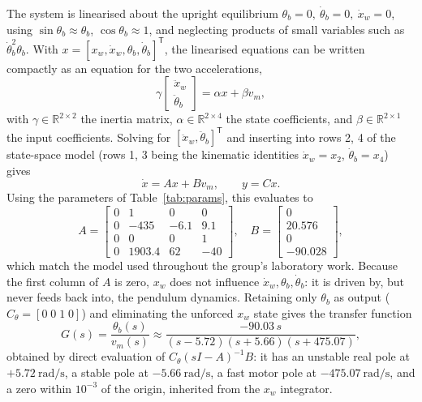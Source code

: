 \documentclass[conference]{IEEEtran}
\newcommand{\mat}[1]{\begin{bmatrix}#1\end{bmatrix}}
\begin{document}
The system is linearised about the upright equilibrium $\theta_b=0,\ \dot\theta_b=0,\ \dot x_w=0$, using $\sin\theta_b\approx\theta_b$, $\cos\theta_b\approx1$, and neglecting products of small variables such as $\dot\theta_b^2\theta_b$. With $x=[x_w,\dot x_w,\theta_b,\dot\theta_b]^{\mathsf T}$, the linearised equations can be written compactly as an equation for the two accelerations,
\begin{equation}
\gamma\mat{\ddot x_w\\\ddot\theta_b} = \alpha x + \beta v_m,
\end{equation}
with $\gamma\in\mathbb{R}^{2\times2}$ the inertia matrix, $\alpha\in\mathbb{R}^{2\times4}$ the state coefficients, and $\beta\in\mathbb{R}^{2\times1}$ the input coefficients. Solving for $[\ddot x_w,\ddot\theta_b]^{\mathsf T}$ and inserting into rows 2, 4 of the state-space model (rows 1, 3 being the kinematic identities $\dot x_w=x_2$, $\dot\theta_b=x_4$) gives
\begin{equation}
\dot x = Ax+Bv_m,\qquad y = Cx.
\end{equation}
Using the parameters of Table~\ref{tab:params}, this evaluates to
\begin{equation}
A=\mat{0&1&0&0\\0&-435&-6.1&9.1\\0&0&0&1\\0&1903.4&62&-40},\quad
B=\mat{0\\20.576\\0\\-90.028},
\end{equation}
which match the model used throughout the group's laboratory work. Because the first column of $A$ is zero, $x_w$ does not influence $\dot x_w,\theta_b,\dot\theta_b$: it is driven by, but never feeds back into, the pendulum dynamics. Retaining only $\theta_b$ as output ($C_\theta=[0\;0\;1\;0]$) and eliminating the unforced $x_w$ state gives the transfer function
\begin{equation}
G(s)=\frac{\theta_b(s)}{v_m(s)}\approx\frac{-90.03\,s}{(s-5.72)(s+5.66)(s+475.07)},
\end{equation}
obtained by direct evaluation of $C_\theta(sI-A)^{-1}B$: it has an unstable real pole at $+5.72\ \text{rad/s}$, a stable pole at $-5.66\ \text{rad/s}$, a fast motor pole at $-475.07\ \text{rad/s}$, and a zero within $10^{-3}$ of the origin, inherited from the $x_w$ integrator.
\end{document}
